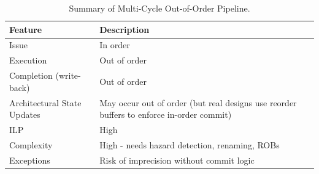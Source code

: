 \begin{table}[!htp]
    \centering
    \begin{tabular}{@{} l | p{21em} @{}}
        \toprule
        \textbf{Feature} & \textbf{Description} \\
        \midrule
        Issue                       & In order                                                                                  \\ [.5em]
        Execution                   & Out of order                                                                              \\ [.5em]
        Completion (write-back)     & Out of order                                                                              \\ [.5em]
        Architectural State Updates & May occur out of order (but real designs use reorder buffers to enforce in-order commit)  \\ [.5em]
        ILP                         & High                                                                                      \\ [.5em]
        Complexity                  & High - needs hazard detection, renaming, ROBs                                             \\ [.5em]
        Exceptions                  & Risk of imprecision without commit logic                                                  \\
        \bottomrule
    \end{tabular}
    \caption{Summary of Multi-Cycle Out-of-Order Pipeline.}
\end{table}